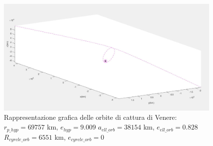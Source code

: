 \documentclass[a4paper]{article}
\begin{document}
\begin{figure}
\includegraphics[width=1\textwidth]{Orbite_finali_Venere.png}
\caption{Rappresentazione grafica delle orbite di cattura di Venere: \newline $r_{p\_hyp} = 69757$ km, $e_{hyp} = 9.009$ \newline $a_{ell\_orb} = 38154$ km, $e_{ell\_orb} = 0.828$ \newline $R_{cyrcle\_orb} = 6551$ km, $e_{cyrcle\_orb} = 0$}
\end{figure}\newpage
\end{document}
